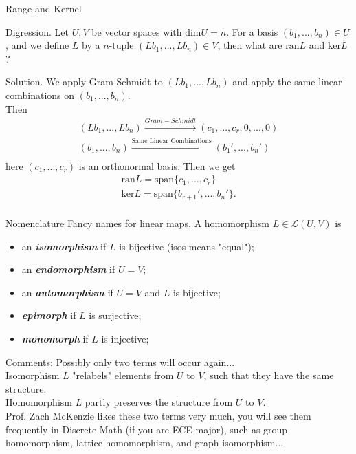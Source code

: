 \documentclass[hyperref={pdfpagelabels=true}]{beamer}
\newcommand{\highlightg}[1]{\textcolor[rgb]{0.1,0.5,0.3}{\emph{\textbf{#1}}}}
\newcommand{\structb}[1]{\textcolor[rgb]{0.2,0.2,0.7}{#1}}
\newcommand{\<}{\langle}
\renewcommand{\>}{\rangle}
\begin{document}
\begin{frame}{Range and Kernel}
    \begin{block}{Digression.}
        Let $U,V$ be vector spaces with $\text{dim}U = n$. For a basis $(b_1,...,b_{n}) \in U$, and we define $L$ by a $n$-tuple $(Lb_{1},...,Lb_{n}) \in V$, then what are $\text{ran}L$ and $\text{ker}L$?
    \end{block}
    \begin{block}{Solution.}
        We apply Gram-Schmidt to $(Lb_{1},...,Lb_{n})$ and apply the same linear combinations on $(b_{1},...,b_{n})$.\\
        Then
        \[
            \begin{aligned}
                (Lb_{1},...,Lb_{n}) \xrightarrow{Gram-Schmidt} (c_{1},...,c_{r},0,...,0)\\
                (b_{1},...,b_{n}) \xrightarrow{\text{Same Linear Combinations}} (b_{1}',...,b_{n}')\\
            \end{aligned}
        \]
        here $(c_{1},...,c_{r})$ is an orthonormal basis.
        Then we get 
        \[
            \begin{aligned}
                \text{ran}L = \text{span}\{c_{1},...,c_{r}\}\\
                \text{ker}L = \text{span}\{b_{r+1}',...,b_{n}'\}.\\
            \end{aligned}
        \]
    \end{block}
\end{frame} 
\begin{frame}{Nomenclature}
    Fancy names for linear maps. A homomorphism $L \in \mathcal{L}(U,V)$ is 
    \begin{itemize}
        \item an \highlightg{isomorphism} if $L$ is bijective (isos means "equal");
        \item an \highlightg{endomorphism} if $U = V$;
        \item an \highlightg{automorphism} if $U = V$ and $L$ is bijective;
        \item \highlightg{epimorph} if $L$ is surjective;
        \item \highlightg{monomorph} if $L$ is injective;
    \end{itemize}
    \begin{block}{Comments:}
        Possibly only two terms will occur again...\\
        \structb{Isomorphism} $L$ "relabels" elements from $U$ to $V$, such that they have the same structure.\\
        \structb{Homomorphism} $L$ partly preserves the structure from $U$ to $V$.\\
        Prof. Zach McKenzie likes these two terms very much, you will see them frequently in Discrete Math (if you are ECE major), such as group homomorphism, lattice homomorphism, and graph isomorphism...
    \end{block}
\end{frame}
\end{document}
